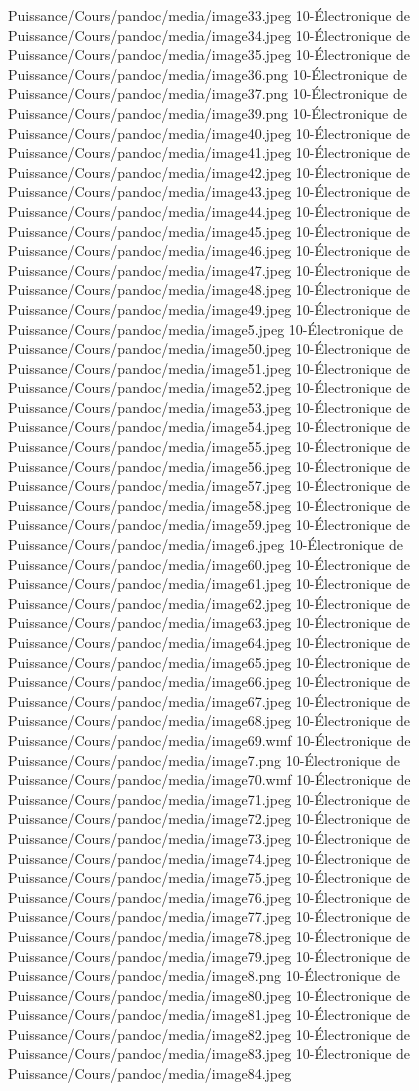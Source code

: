 Puissance/Cours/pandoc/media/image33.jpeg 10-Électronique de Puissance/Cours/pandoc/media/image34.jpeg 10-Électronique de Puissance/Cours/pandoc/media/image35.jpeg 10-Électronique de Puissance/Cours/pandoc/media/image36.png 10-Électronique de Puissance/Cours/pandoc/media/image37.png 10-Électronique de Puissance/Cours/pandoc/media/image39.png 10-Électronique de Puissance/Cours/pandoc/media/image40.jpeg 10-Électronique de Puissance/Cours/pandoc/media/image41.jpeg 10-Électronique de Puissance/Cours/pandoc/media/image42.jpeg 10-Électronique de Puissance/Cours/pandoc/media/image43.jpeg 10-Électronique de Puissance/Cours/pandoc/media/image44.jpeg 10-Électronique de Puissance/Cours/pandoc/media/image45.jpeg 10-Électronique de Puissance/Cours/pandoc/media/image46.jpeg 10-Électronique de Puissance/Cours/pandoc/media/image47.jpeg 10-Électronique de Puissance/Cours/pandoc/media/image48.jpeg 10-Électronique de Puissance/Cours/pandoc/media/image49.jpeg 10-Électronique de Puissance/Cours/pandoc/media/image5.jpeg 10-Électronique de Puissance/Cours/pandoc/media/image50.jpeg 10-Électronique de Puissance/Cours/pandoc/media/image51.jpeg 10-Électronique de Puissance/Cours/pandoc/media/image52.jpeg 10-Électronique de Puissance/Cours/pandoc/media/image53.jpeg 10-Électronique de Puissance/Cours/pandoc/media/image54.jpeg 10-Électronique de Puissance/Cours/pandoc/media/image55.jpeg 10-Électronique de Puissance/Cours/pandoc/media/image56.jpeg 10-Électronique de Puissance/Cours/pandoc/media/image57.jpeg 10-Électronique de Puissance/Cours/pandoc/media/image58.jpeg 10-Électronique de Puissance/Cours/pandoc/media/image59.jpeg 10-Électronique de Puissance/Cours/pandoc/media/image6.jpeg 10-Électronique de Puissance/Cours/pandoc/media/image60.jpeg 10-Électronique de Puissance/Cours/pandoc/media/image61.jpeg 10-Électronique de Puissance/Cours/pandoc/media/image62.jpeg 10-Électronique de Puissance/Cours/pandoc/media/image63.jpeg 10-Électronique de Puissance/Cours/pandoc/media/image64.jpeg 10-Électronique de Puissance/Cours/pandoc/media/image65.jpeg 10-Électronique de Puissance/Cours/pandoc/media/image66.jpeg 10-Électronique de Puissance/Cours/pandoc/media/image67.jpeg 10-Électronique de Puissance/Cours/pandoc/media/image68.jpeg 10-Électronique de Puissance/Cours/pandoc/media/image69.wmf 10-Électronique de Puissance/Cours/pandoc/media/image7.png 10-Électronique de Puissance/Cours/pandoc/media/image70.wmf 10-Électronique de Puissance/Cours/pandoc/media/image71.jpeg 10-Électronique de Puissance/Cours/pandoc/media/image72.jpeg 10-Électronique de Puissance/Cours/pandoc/media/image73.jpeg 10-Électronique de Puissance/Cours/pandoc/media/image74.jpeg 10-Électronique de Puissance/Cours/pandoc/media/image75.jpeg 10-Électronique de Puissance/Cours/pandoc/media/image76.jpeg 10-Électronique de Puissance/Cours/pandoc/media/image77.jpeg 10-Électronique de Puissance/Cours/pandoc/media/image78.jpeg 10-Électronique de Puissance/Cours/pandoc/media/image79.jpeg 10-Électronique de Puissance/Cours/pandoc/media/image8.png 10-Électronique de Puissance/Cours/pandoc/media/image80.jpeg 10-Électronique de Puissance/Cours/pandoc/media/image81.jpeg 10-Électronique de Puissance/Cours/pandoc/media/image82.jpeg 10-Électronique de Puissance/Cours/pandoc/media/image83.jpeg 10-Électronique de Puissance/Cours/pandoc/media/image84.jpeg 